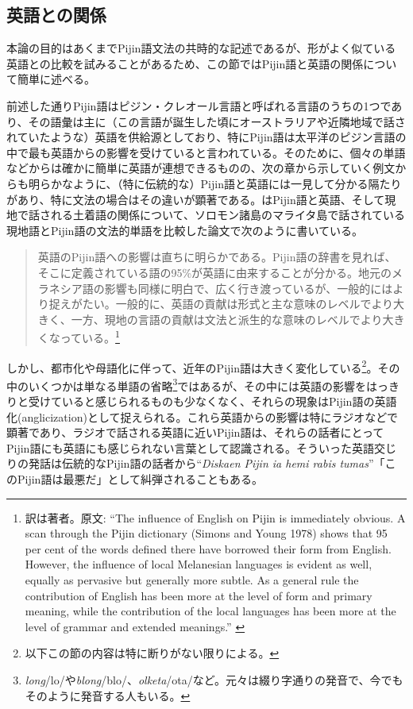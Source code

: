 \subsection{英語との関係}
本論の目的はあくまでPijin語文法の共時的な記述であるが、形がよく似ている英語との比較を試みることがあるため、この節ではPijin語と英語の関係について簡単に述べる。

前述した通りPijin語はピジン・クレオール言語と呼ばれる言語のうちの1つであり、その語彙は主に（この言語が誕生した頃にオーストラリアや近隣地域で話されていたような）英語を供給源としており、特にPijin語は太平洋のピジン言語の中で最も英語からの影響を受けていると言われている\citep{nativization}。そのために、個々の単語などからは確かに簡単に英語が連想できるものの、次の章から示していく例文からも明らかなように、（特に伝統的な）Pijin語と英語には一見して分かる隔たりがあり、特に文法の場合はその違いが顕著である。\cite{malaitan}はPijin語と英語、そして現地で話される土着語の関係について、ソロモン諸島のマライタ島で話されている現地語とPijin語の文法的単語を比較した論文で次のように書いている。

\begin{quotation}
  英語のPijin語への影響は直ちに明らかである。Pijin語の辞書\citep{yumi}を見れば、そこに定義されている語の95\%が英語に由来することが分かる。地元のメラネシア語の影響も同様に明白で、広く行き渡っているが、一般的にはより捉えがたい。一般的に、英語の貢献は形式と主な意味のレベルでより大きく、一方、現地の言語の貢献は文法と派生的な意味のレベルでより大きくなっている。\citep{malaitan}\footnote{
  訳は著者。原文: ``The influence of English on Pijin is immediately obvious. A scan through the Pijin dictionary (Simons and Young 1978) shows that 95 per cent of the words defined there have borrowed their form from English. However, the influence of local Melanesian languages is evident as well, equally as pervasive but generally more subtle. As a general rule the contribution of English has been more at the level of form and primary meaning, while the contribution of the local languages has been more at the level of grammar and extended meanings.'' \citep{malaitan}}
\end{quotation}

しかし、都市化や母語化に伴って、近年のPijin語は大きく変化している\footnote{
以下この節の内容は特に断りがない限り\cite{nativization}による。}。その中のいくつかは単なる単語の省略\footnote{
\textit{long}/lo/や\textit{blong}/blo/、\textit{olketa}/ota/など。元々は綴り字通りの発音で、今でもそのように発音する人もいる。}ではあるが、その中には英語の影響をはっきりと受けていると感じられるものも少なくなく、それらの現象はPijin語の英語化(anglicization)として捉えられる。これら英語からの影響は特にラジオなどで顕著であり、ラジオで話される英語に近いPijin語は、それらの話者にとってPijin語にも英語にも感じられない言葉として認識される。そういった英語交じりの発話は伝統的なPijin語の話者から``\textit{Diskaen Pijin ia hemi rabis tumas}''「このPijin語は最悪だ」として糾弾されることもある。

